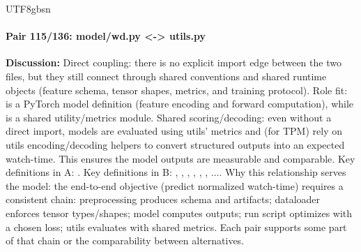 \documentclass[11pt]{article}
\begin{document}
\begin{CJK*}{UTF8}{gbsn}
\paragraph{Pair 115/136: model/wd.py <-> utils.py}
\textbf{Discussion:} Direct coupling: there is no explicit import edge between the two files, but they still connect through shared conventions and shared runtime objects (feature schema, tensor shapes, metrics, and training protocol). Role fit: \texttt{} is a PyTorch model definition (feature encoding and forward computation), while \texttt{} is a shared utility/metrics module. Shared scoring/decoding: even without a direct import, models are evaluated using utils' metrics and (for TPM) rely on utils encoding/decoding helpers to convert structured outputs into an expected watch-time. This ensures the model outputs are measurable and comparable. Key definitions in A: \texttt{}. Key definitions in B: \texttt{}, \texttt{}, \texttt{}, \texttt{}, \texttt{}, \texttt{}, .... Why this relationship serves the model: the end-to-end objective (predict normalized watch-time) requires a consistent chain: preprocessing produces schema and artifacts; dataloader enforces tensor types/shapes; model computes outputs; run script optimizes with a chosen loss; utils evaluates with shared metrics. Each pair supports some part of that chain or the comparability between alternatives.


\end{CJK*}
\end{document}
